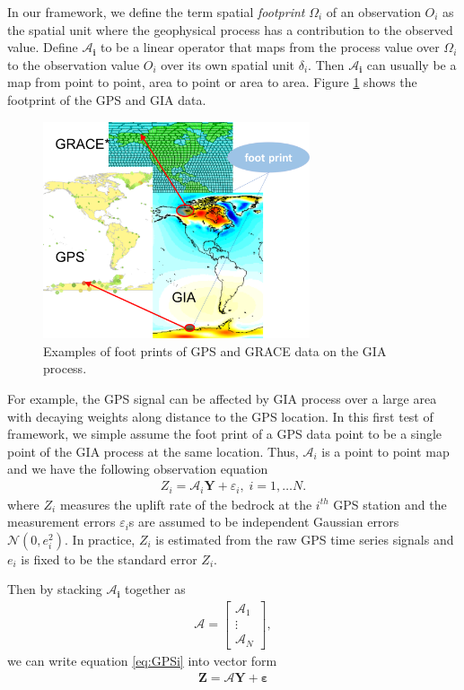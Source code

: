 \documentclass[a4paper,12pt]{article}
\begin{document}
In our framework, we define the term spatial \emph{\gls{footprint}} $\Omega_i$ of an observation $O_i$ as the spatial unit where the geophysical process has a contribution to the observed value. Define $\bm{\mathcal{A}_i}$ to be a linear operator that maps from the process value over $\Omega_i$ to the observation value $O_i$ over its own spatial unit $\delta_i$. Then $\bm{\mathcal{A}_i}$ can usually be a map from point to point, area to point or area to area. Figure \ref{fig:footprint} shows the footprint of the GPS and GIA data.
\begin{figure}[hbtp]
\centering
\includegraphics[width= 0.7\textwidth]{footprint}
\caption{Examples of foot prints of GPS and GRACE data on the GIA process.}\label{fig:footprint}
\end{figure}


For example, the GPS signal can be affected by GIA process over a large area with decaying weights along distance to the GPS location. In this first test of framework, we simple assume the foot print of a GPS data point to be a single point of the GIA process at the same location. Thus, $\mathcal{A}_i$ is a point to point map and we have the following observation equation
\begin{align}\label{eq:GPSi}
Z_i = \bm{\mathcal{A}}_i\bm{Y} + \varepsilon_i, \; i = 1,\dots N.
\end{align} 
where $Z_i$ measures the uplift rate of the bedrock at the $i^{th}$ GPS station and the measurement errors $\varepsilon_i$s are assumed to be independent Gaussian errors $\mathcal{N}(0, e_i^2)$. In practice, $Z_i$ is estimated from the raw GPS time series signals and $e_i$ is fixed to be the standard error $Z_i$. 

Then by stacking $\bm{\mathcal{A}_i}$ together as 
\begin{align*}
\bm{\mathcal{A}} = \left[\begin{array}{c}
 \bm{\mathcal{A}}_1\\ \vdots \\ \bm{\mathcal{A}}_N \end{array} \right],
\end{align*}
we can write equation \eqref{eq:GPSi} into vector form
\begin{align}\label{eq:GPS}
\bm{Z} = \bm{\mathcal{A}}\bm{Y} + \bm{\varepsilon} 
\end{align}
\end{document}
